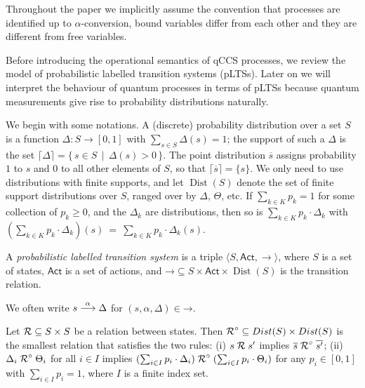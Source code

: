 \documentclass[a4paper,runningheads]{llncs}
\newcommand{\dist}[1]{\mathop{Dist} ({#1})   } %
\newcommand{\pdist}[1]{\overline{#1}  } %
\newcommand{\support}[1]{\lceil{#1}\rceil}
\newcommand{\lift}[1]{\mathrel{{#1}^\circ}}
\newcommand{\Act}{\ensuremath{\mathsf{Act}}\xspace}
\newcommand{\setof}[2]{\{ \, #1 \, \mid \, #2 \, \}}%
\begin{document}
Throughout the paper we implicitly assume the convention that processes are identified up to $\alpha$-conversion, bound variables differ from each other and they are different from free variables.

Before introducing the operational semantics of qCCS processes, we review the model of probabilistic labelled
transition systems (pLTSs). Later on we will interpret the behaviour
of quantum processes in terms of pLTSs because quantum measurements give rise to probability distributions naturally.

We begin with some notations. A (discrete) probability distribution
over a set $S$ is a function $\Delta \colon S \rightarrow [0, 1] $ with
$\sum_{s\in S} \Delta(s) = 1$; the support of such a $\Delta$ is
the set $\support{\Delta} = \setof{s \in S}{\Delta(s) > 0}$.
The point distribution $\pdist{s}$ assigns probability
$1$ to $s$ and $0$ to all other elements of $S$, so that
$\support{\pdist{s}} = \{s\}$. We only need to use distributions with finite supports, and let $\dist{S}$ denote the set of
finite support distributions over $S$, ranged over by $\Delta$, $\Theta$, etc.
If $\sum_{k \in K} p_k = 1$ for some
collection of  $p_k \geq 0$, and the $\Delta_k$ are distributions,
then so is $\sum_{k \in K}p_k \cdot \Delta_k$ with
$(\sum_{k \in K}p_k \cdot \Delta_k)(s)~=~\sum_{k\in K} p_k\cdot \Delta_k(s).$


\begin{definition}\label{def:LTS}
	A \emph{probabilistic labelled transition system}
	is a triple
	$\langle S, \Act,  \rightarrow  \rangle$, where
	$S$ is a set of states,
	$\Act$ is a set of actions, and $\mathord{\rightarrow} \subseteq
	S \times \Act \times \dist{S}$ is the transition relation.
\end{definition}

We often write $s\mathrel{\stackrel{\alpha}{\longrightarrow}}\Delta$ for $(s,\alpha,\Delta)\in\mathord{\rightarrow}$. %
\begin{definition}\label{def:lift}
	Let  $\mathord{\mathrel{{\mathcal R }}} \subseteq
	S\times S$ be a relation between states.
	Then $\mathord{\lift{\aRel}} \subseteq \dist{S} \times
	\dist{S}$ is the smallest relation that satisfies the two rules:
	(i) $s \mathrel{{\mathcal R }} s'$ implies $\pdist{s} \lift{\aRel} \pdist{s'}$;
	(ii) $\Delta_i \lift{\aRel} \Theta_i$ for all $i\in I$ implies
	$(\sum_{i\in I}p_i\cdot\Delta_i)\lift{\aRel}(\sum_{i\in I}p_i\cdot\Theta_i)$
	for any $p_i \in [0,1]$ with $\sum_{i\in I}p_i = 1$, where $I$ is a
	finite index set.
\end{definition}
\end{document}
